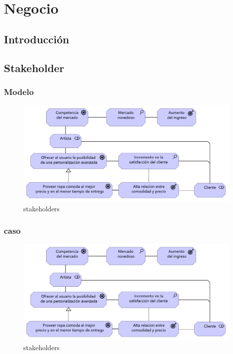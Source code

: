 \graphicspath{{./2-Arquitectura/capitulo5/}}

\chapter{Negocio}
\section{Introducción}
\newpage
\section{Stakeholder}
\subsection{Modelo}
\begin{figure}[h!]
	\centering
	\includegraphics[width=0.7\linewidth]{imgs/stakeholders}
	\caption{stakeholders}
	\label{fig:stakeholders}
\end{figure}
\newpage
\subsection{caso}
\begin{figure}[h!]
	\centering
	\includegraphics[width=0.7\linewidth]{imgs/stakeholders}
	\caption{stakeholders}
	\label{fig:stakeholders}
\end{figure}
\newpage